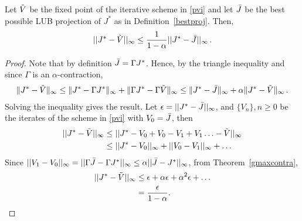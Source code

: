 \begin{theorem}\label{fxpres}
Let $\tilde{V}$ be the fixed point of the iterative scheme in \eqref{pvi} and let $\bar{J}$ be the best possible LUB projection of $J^*$ as in Definition~\ref{bestproj}. Then,
\begin{align}
||J^*-\tilde{V}||_\infty\leq \frac{1}{1-\alpha}||J^*-\bar{J}||_\infty\,.
\end{align}
\end{theorem}
\begin{proof}
Note that by definition $\bar{J} = \Gamma J^*$.
Hence, by the triangle inequality and since $\Gamma$ is an $\alpha$-contraction,
\begin{align*}
\|J^* - \tilde{V} \|_{\infty} \le \| J^* - \Gamma J^* \|_{\infty} + \|\Gamma J^* - \Gamma \tilde{V} \|_{\infty}
\le  \| J^* - \bar{J} \|_{\infty} + \alpha \|J^* - \tilde{V}\|_{\infty}\,.
\end{align*}
Solving the inequality gives the result.
Let $\epsilon=||J^*-\bar{J}||_\infty$, and $\{V_n\},n\geq 0$ be the iterates of the scheme in \eqref{pvi} with $V_0=\bar{J}$, then
\begin{align}
||J^*-\tilde{V}||_\infty&\leq ||J^*-V_0+V_0-V_1+V_1\ldots-\tilde{V}||_\infty\nonumber\\
&\leq ||J^*-V_0||_\infty+||V_0-V_1||_\infty+\ldots\nonumber
\end{align}
Since $||V_1-V_0||_\infty=||\Gamma \bar{J}-\Gamma J^*||_\infty\leq\alpha||\bar{J}-J^*||_\infty$, from Theorem~\ref{gmaxcontra},
\begin{align}
||J^*-\tilde{V}||_\infty&\leq \epsilon+\alpha\epsilon+\alpha^2\epsilon+\ldots\nonumber\\
&=\frac{\epsilon}{1-\alpha}.
\end{align}
\fi
\end{proof}
